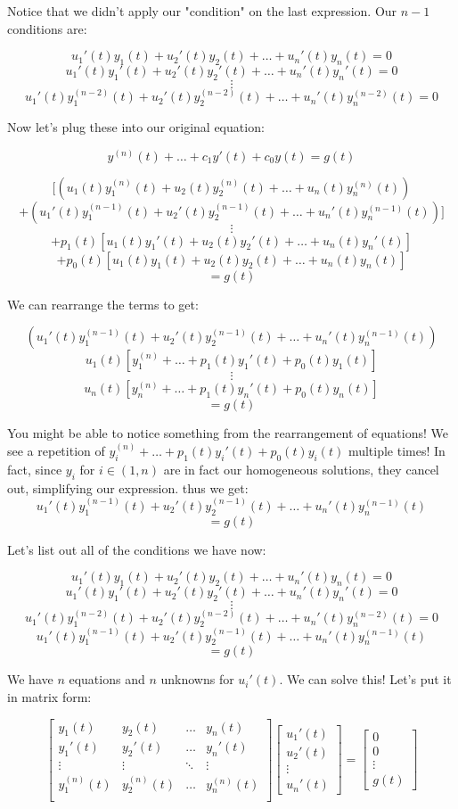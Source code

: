 \documentclass{report}
\begin{document}
Notice that we didn't apply our "condition" on the last expression. Our $n-1$ conditions are:

$$u_1'(t)y_1(t) + u_2'(t)y_2(t) + \dots + u_n'(t)y_n(t) = 0$$
$$u_1'(t)y_1'(t) + u_2'(t)y_2'(t) + \dots + u_n'(t)y_n'(t) = 0$$
$$\vdots$$
$$u_1'(t)y_1^{(n-2)}(t) + u_2'(t)y_2^{(n-2)}(t) + \dots + u_n'(t)y_n^{(n-2)}(t) = 0$$


Now let's plug these into our original equation:

$$y^{(n)}(t) + \dots + c_1y'(t) + c_0y(t) = g(t)$$

$$[(u_1(t)y_1^{(n)}(t) + u_2(t)y_2^{(n)}(t) + \dots + u_n(t)y_n^{(n)}(t))$$
$$+ (u_1'(t)y_1^{(n-1)}(t) + u_2'(t)y_2^{(n-1)}(t) + \dots + u_n'(t)y_n^{(n-1)}(t))]$$
$$\vdots$$
$$+ p_1(t)[u_1(t)y_1'(t) + u_2(t)y_2'(t) + \dots + u_n(t)y_n'(t)]$$
$$+ p_0(t)[u_1(t)y_1(t) + u_2(t)y_2(t) + \dots + u_n(t)y_n(t)]$$
$$=g(t)$$

We can rearrange the terms to get:

$$(u_1'(t)y_1^{(n-1)}(t) + u_2'(t)y_2^{(n-1)}(t) + \dots + u_n'(t)y_n^{(n-1)}(t))$$
$$u_1(t)[y_1^{(n)} + \dots + p_1(t)y_1'(t) + p_0(t)y_1(t)]$$
$$\vdots$$
$$u_n(t)[y_n^{(n)} + \dots + p_1(t)y_n'(t) + p_0(t)y_n(t)]$$
$$=g(t)$$

You might be able to notice something from the rearrangement of equations! We see a repetition of $y_i^{(n)} + \dots + p_1(t)y_i'(t) + p_0(t)y_i(t)$
multiple times! In fact, since $y_i$ for $i \in (1,n)$ are in fact our homogeneous solutions, they cancel out, simplifying our expression. thus we get:
$$u_1'(t)y_1^{(n-1)}(t) + u_2'(t)y_2^{(n-1)}(t) + \dots + u_n'(t)y_n^{(n-1)}(t)$$
$$=g(t)$$

Let's list out all of the conditions we have now:


$$u_1'(t)y_1(t) + u_2'(t)y_2(t) + \dots + u_n'(t)y_n(t) = 0$$
$$u_1'(t)y_1'(t) + u_2'(t)y_2'(t) + \dots + u_n'(t)y_n'(t) = 0$$
$$\vdots$$
$$u_1'(t)y_1^{(n-2)}(t) + u_2'(t)y_2^{(n-2)}(t) + \dots + u_n'(t)y_n^{(n-2)}(t) = 0$$
$$u_1'(t)y_1^{(n-1)}(t) + u_2'(t)y_2^{(n-1)}(t) + \dots + u_n'(t)y_n^{(n-1)}(t)$$
$$=g(t)$$

We have $n$ equations and $n$ unknowns for $u_i'(t)$. We can solve this! Let's put it in matrix form:

$$
\begin{bmatrix}
    y_1(t) & y_2(t) & \dots  & y_n(t) \\
    y_1'(t) & y_2'(t) & \dots  & y_n'(t) \\
    \vdots & \vdots & \ddots & \vdots \\
    y_1^{(n)}(t) & y_2^{(n)}(t) & \dots  & y_n^{(n)}(t) \\
    \end{bmatrix}
\begin{bmatrix}
    u_1'(t) \\
    u_2'(t) \\
    \vdots \\ 
    u_n'(t)
\end{bmatrix}
=
\begin{bmatrix}
    0 \\
    0 \\
    \vdots \\ 
    g(t)
\end{bmatrix}
$$
\end{document}
